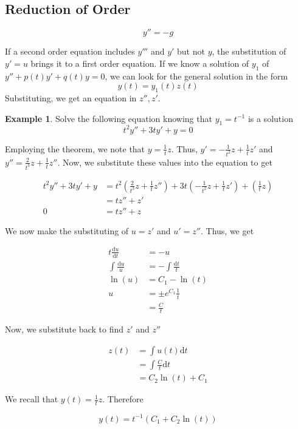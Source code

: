 \documentclass[11pt]{article}
\theoremstyle{plain} %
\theoremstyle{definition}
\theoremstyle{example}
\newtheorem*{example}{Example}
\theoremstyle{remark}
\begin{document}
\subsection{Reduction of Order}
$$y'' = -g$$

If a second order equation includes $y'''$ and $y'$ but not $y$, the substitution of $y' = u$ brings it to a first order equation. If we know a solution of $y_1$ of $y'' + p(t)y' + q(t)y = 0$, we can look for the general solution in the form $$y(t) = y_1(t)z(t)$$
Substituting, we get an equation in $z'', z'$.

\begin{example}
Solve the following equation knowing that $y_1 = t^{-1}$ is a solution
 $$t^2y'' + 3ty' + y = 0$$
\end{example}

Employing the theorem, we note that $y=\frac{1}{t}z$. Thus, $y' = -\frac{1}{t^2}z+ \frac{1}{t}z'$ and $y'' = \frac{2}{t^3}z + \frac{1}{t}z''$. Now, we substitute these values into the equation to get

\begin{align*}
t^2y'' + 3ty' + y &= t^2\left(\frac{2}{t^3}z + \frac{1}{t}z''\right) + 3t\left(-\frac{1}{t^2}z+ \frac{1}{t}z'\right) + \left(\frac{1}{t}z\right)\\
&= tz'' + z'\\
0 &= tz'' + z
\end{align*}

We now make the substituting of $u =z'$ and $u' = z''$. Thus, we get

\begin{align*}
t\frac{\mathrm d u}{\mathrm d t} &= -u\\
\int\frac{\mathrm d u}{u} &= -\int\frac{\mathrm d t}{t}\\
\ln(u) &= C_1-\ln(t)\\
u &= \pm e^{C_1}\frac{1}{t}\\
&= \frac{C}{t}
\end{align*}

Now, we substitute back to find $z'$ and $z''$

\begin{align*}
z(t) &= \int u(t) \mathrm d t\\
&= \int \frac{C}{t} \mathrm d t\\
&= C_2\ln(t) + C_1
\end{align*}

We recall that $y (t) = \frac{1}{t}z$. Therefore

$$y(t) = t^{-1}\left(C_1 + C_2\ln(t)\right)$$
\end{document}
